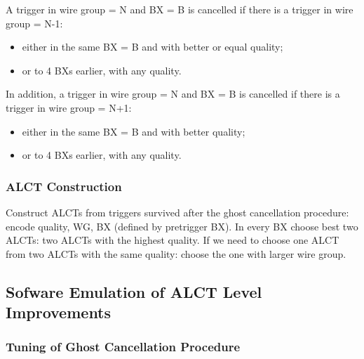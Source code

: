 A trigger in wire group = N and BX = B is cancelled if there is a trigger in wire group = N-1:
\begin{itemize}
    \item either in the same BX = B and with better or equal quality;
    \item or to 4 BXs earlier, with any quality.
\end{itemize}

In addition, a trigger in wire group = N and BX = B is cancelled if there is a trigger in wire group = N+1:
\begin{itemize}
    \item either in the same BX = B and with better quality;
    \item or to 4 BXs earlier, with any quality.
\end{itemize}

\subsubsection{ALCT Construction}

Construct ALCTs from triggers survived after the ghost cancellation procedure: encode quality, WG, BX (defined by pretrigger BX). In every BX choose best two ALCTs: two ALCTs with the highest quality. If we need to choose one ALCT from two ALCTs with the same quality: choose the one with larger wire group.


\subsection{Sofware Emulation of ALCT Level Improvements}

\subsubsection{Tuning of Ghost Cancellation Procedure}

